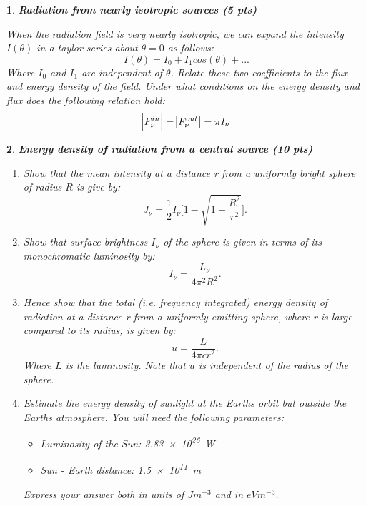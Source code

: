 \documentclass{article}
\newtheorem{p}{}[section]
\begin{document}
	\begin{p}
		\textbf{Radiation from nearly isotropic sources (5 pts)}

		\noindent
		When the radiation field is very nearly isotropic, we can expand the intensity $I(\theta)$ in a taylor series about $\theta =0$ as follows: 
		\begin{equation}
			I(\theta)= I_{0} + I_{1} cos(\theta) + ...
		\end{equation}
		Where $I_{0}$ and $I_{1}$ are independent of $\theta$. Relate these two coefficients to the flux and energy density of the field. Under what conditions on the energy density and flux does the following relation hold:
		\begin{equation}
			\abs{F^{in}_{\nu}} = \abs{F^{out}_{\nu}} = \pi I_{\nu}
		\end{equation}
	\end{p}

	\begin{p}
		\textbf{Energy density of radiation from a central source (10 pts)}
		\begin{enumerate}[label=(\alph*)]
			\item Show that the mean intensity at a distance r from a uniformly bright sphere of radius $R$ is give by:
			\begin{equation}
				J_{\nu}=\frac{1}{2} I_{\nu} \Bigg[1 - \sqrt{1-\frac{R^{2}}{r^{2}}}\Bigg].
			\end{equation}
			\item Show that surface brightness $I_{\nu}$ of the sphere is given in terms of its monochromatic luminosity by:
			\begin{equation}
				I_{\nu}= \frac{L_{\nu}}{4\pi^{2}R^{2}}.
			\end{equation}
			\item Hence show that the total (i.e. frequency integrated) energy density of radiation at a distance r from a uniformly emitting sphere, where r is large compared to its radius, is given by: 
			\begin{equation}
				u=\frac{L}{4\pi c r^2}.
			\end{equation}
			Where $L$ is the luminosity. Note that $u$ is independent of the radius of the sphere. 
			\item  Estimate the energy density of sunlight at the Earths orbit but outside the Earths atmosphere. You will need the following parameters:
			\begin{itemize}
				\item Luminosity of the Sun: \SI{3.83e26}{\watt}
				\item Sun - Earth distance: \SI{1.5e11}{\meter}
			\end{itemize}
			Express your answer both in units of $J m^{-3}$ and in $eV m^{-3}$.
		\end{enumerate}
	\end{p}
\end{document}
